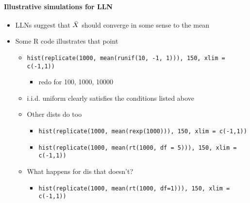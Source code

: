 \paragraph{Illustrative simulations for LLN}
\begin{itemize}
\item LLNs suggest that $\bar{X}$ should converge in some sense to the mean
\item Some R code illustrates that point
\begin{itemize}
\item \texttt{hist(replicate(1000, mean(runif(10, -1, 1))), 150, xlim = c(-1,1))}
\begin{itemize}
\item redo for 100, 1000, 10000
\end{itemize}
\item i.i.d. uniform clearly satisfies the conditions listed above
\item Other dists do too
\begin{itemize}
\item \texttt{hist(replicate(1000, mean(rexp(1000))), 150, xlim = c(-1,1))}
\item \texttt{hist(replicate(1000, mean(rt(1000, df = 5))), 150, xlim = c(-1,1))}
\end{itemize}
\item What happens for dis that doesn't?
\begin{itemize}
\item \texttt{hist(replicate(1000, mean(rt(1000, df=1))), 150, xlim = c(-1,1))}
\end{itemize}
\end{itemize}
\end{itemize}

